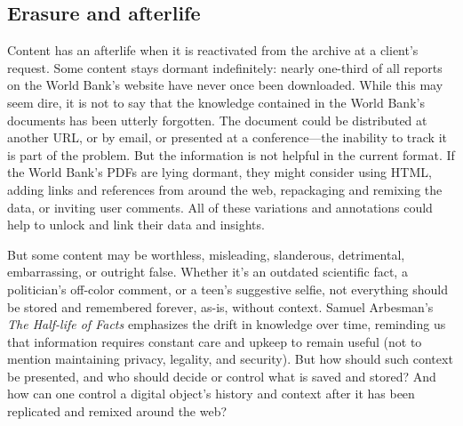 

\subsection{Erasure and afterlife}

Content has an afterlife when it is reactivated from the archive at a client's request. Some content stays dormant indefinitely: nearly one-third of all reports on the World Bank's website have never once been downloaded.\autocite{trevino_which_2014} While this may seem dire, it is not to say that the knowledge contained in the World Bank's documents has been utterly forgotten. The document could be distributed at another URL, or by email, or presented at a conference---the inability to track it is part of the problem. But the information is not helpful in the current format. If the World Bank's PDFs are lying dormant, they might consider using HTML, adding links and references from around the web, repackaging and remixing the data, or inviting user comments. All of these variations and annotations could help to unlock and link their data and insights.

But some content may be worthless, misleading, slanderous, detrimental, embarrassing, or outright false. Whether it's an outdated scientific fact, a politician's off-color comment, or a teen's suggestive selfie, not everything should be stored and remembered forever, as-is, without context. Samuel Arbesman's \emph{The Half-life of Facts} emphasizes the drift in knowledge over time, reminding us that information requires constant care and upkeep to remain useful (not to mention maintaining privacy, legality, and security).\autocite{arbesman_half-life_2013} But how should such context be presented, and who should decide or control what is saved and stored? And how can one control a digital object's history and context after it has been replicated and remixed around the web?

